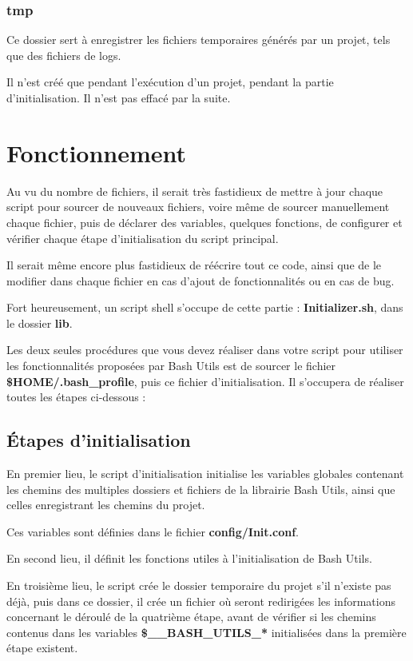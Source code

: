 \documentclass[a4paper,10pt]{article}
\begin{document}
\color{blue}
\subsubsection{tmp}\color{white}
Ce dossier sert à enregistrer les fichiers temporaires générés par un projet, tels que des fichiers de logs.

Il n'est créé que pendant l'exécution d'un projet, pendant la partie d'initialisation. Il n'est pas effacé par la suite.


\color{red}
\section{Fonctionnement}\color{white}
Au vu du nombre de fichiers, il serait très fastidieux de mettre à jour chaque script pour sourcer de nouveaux fichiers, voire même de sourcer manuellement chaque fichier, puis de déclarer des variables, quelques fonctions, de configurer et vérifier chaque étape d'initialisation du script principal.

Il serait même encore plus fastidieux de réécrire tout ce code, ainsi que de le modifier dans chaque fichier en cas d'ajout de fonctionnalités ou en cas de bug.

Fort heureusement, un script shell s'occupe de cette partie : \color{lime}\textbf{Initializer.sh}\color{white}, dans le dossier \color{lime}\textbf{lib}\color{white}.

Les deux seules procédures que vous devez réaliser dans votre script pour utiliser les fonctionnalités proposées par Bash Utils est de sourcer le fichier \color{orange}\textbf{\$HOME\color{lime}/.bash\_profile}\color{white}, puis ce fichier d'initialisation. Il s'occupera de réaliser toutes les étapes ci-dessous :

\color{green}
\subsection{Étapes d'initialisation}\color{white}
En premier lieu, le script d'initialisation initialise les variables globales contenant les chemins des multiples dossiers et fichiers de la librairie Bash Utils, ainsi que celles enregistrant les chemins du projet.

Ces variables sont définies dans le fichier \color{lime}\textbf{config/Init.conf}\color{white}.

En second lieu, il définit les fonctions utiles à l'initialisation de Bash Utils.

En troisième lieu, le script crée le dossier temporaire du projet s'il n'existe pas déjà, puis dans ce dossier, il crée un fichier où seront redirigées les informations concernant le déroulé de la quatrième étape, avant de vérifier si les chemins contenus dans les variables \color{orange}\textbf{\$\_\_BASH\_UTILS\_*}\color{white} initialisées dans la première étape existent.
\end{document}
